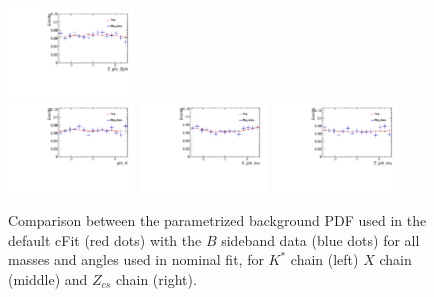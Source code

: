 \begin{figure}[!hbtp]
\includegraphics[width=0.3\textwidth]{Figures/03_Zcs/app_sideband/Z_phi_Zphi.pdf}\\
\includegraphics[width=0.3\textwidth]{Figures/03_Zcs/app_sideband/phi_K.pdf} %
\includegraphics[width=0.3\textwidth]{Figures/03_Zcs/app_sideband/X_phi_mu.pdf} %
\includegraphics[width=0.3\textwidth]{Figures/03_Zcs/app_sideband/Z_phi_mu.pdf}%
\caption{Comparison between the parametrized background PDF used in the default cFit (red dots) with the $B$ sideband data (blue dots) for all masses and angles used in nominal fit, for $K^*$ chain (left) $X$ chain (middle) and $Z_{cs}$ chain (right).}
\label{fig:mass_distribution_phi_sideband}
\end{figure}


